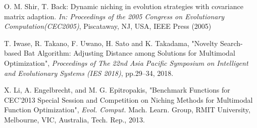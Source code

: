 \documentclass[conference]{IEEEtran}
\begin{document}
\begin{thebibliography}{00}
O. M. Shir, T. Back: Dynamic niching in evolution strategies with covariance matrix adaption. \textit{In: Proceedings of the 2005 Congress on Evolutionary Computation(CEC2005)}, Piscataway, NJ, USA, IEEE Press (2005)


 T. Iwase, R. Takano, F. Uwano, H. Sato and K. Takadama, "Novelty Search-based Bat Algorithm: Adjusting Distance among Solutions for Multimodal Optimization", {\it Proceedings of The 22nd Asia Pacific Symposium on Intelligent and Evolutionary Systems (IES 2018)}, pp.29--34, 2018. 

X. Li, A. Engelbrecht, and M. G. Epitropakis, "Benchmark Functions for CEC'2013 Special Session and Competition on Niching Methods for Multimodal Function Optimization", {\it Evol. Comput.} Mach. Learn. Group, RMIT University, Melbourne, VIC, Australia, Tech. Rep., 2013.
\end{thebibliography}
\end{document}
